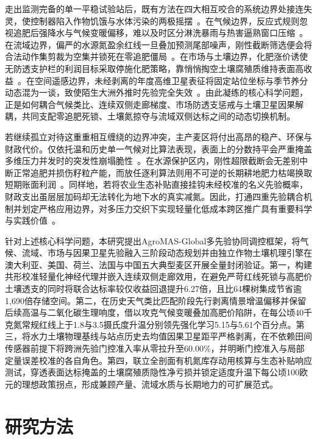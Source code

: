 \documentclass[11pt,a4paper]{article}
\begin{document}
走出监测完备的单一平稳试验站后，既有方法在四大相互咬合的系统边界处接连失灵，使控制器陷入作物饥饿与水体污染的两极摇摆~\citep{baja2025}。在气候边界，反应式规则忽视追肥后强降水与气候变暖偏移，难以及时区分淋洗暴雨与热害逼熟窗口压缩~\citep{asseng2015}。在流域边界，偏严的水源氮盈余红线一旦叠加预测尾部噪声，刚性截断筛选便会将合法动作集剪裁为空集并锁死在零追肥僵局~\citep{eu1991,klages2020}。在市场与土壤边界，化肥涨价诱使无防透支护栏的利润目标采取停施化肥策略，靠悄悄掏空土壤腐殖质维持表面高收益~\citep{eschmann2021,tan2005}。在空间遥感边界，未经剥离的年度高维卫星表征将固定站位坐标与季节养分动态混为一谈，致使陌生大洲外推时先验完全失效~\citep{gaso2023,roberts2017}。由此凝练的核心科学问题，正是如何耦合气候类比、连续双侧走廊梯度、市场防透支惩戒与土壤卫星因果解耦，共同支配零追肥死锁、土壤氮掠夺与流域双侧达标之间的动态切换机制。

若继续孤立对待这重重相互缠绕的边界冲突，主产麦区将付出高昂的稳产、环保与财政代价。仅依托温和历史单一气候对比算法表现，表面上的分数持平会严重掩盖多维压力并发时的突发性崩塌脆性~\citep{baja2025}。在水源保护区内，刚性超限截断会无差别中断正常追肥并损伤籽粒产能，而放任逐利算法则用不可逆的长期耕地肥力枯竭换取短期账面利润~\citep{zhou2016,booth2023}。同样地，若将农业生态补贴直接挂钩未经校准的名义先验概率，财政支出虽层层加码却无法转化为地下水的真实减氮。因此，打通四重先验耦合机制并划定严格应用边界，对多压力交织下实现轻量化低成本跨区推广具有重要科学与实践价值~\citep{goldenits2024}。

针对上述核心科学问题，本研究提出AgroMAS-Global多先验协同调控框架，将气候、流域、市场与因果卫星先验融入三阶段动态规划并由独立作物土壤机理引擎在澳大利亚、美国、荷兰、法国与中国五大典型麦区开展全量封闭验证。第一，构建共形校准轻量化神经代理并嵌入连续双侧走廊效用，在避免严苛红线死锁与高肥价土壤透支的同时将联合达标率较仅收益回退提升6.27倍，且比64棵树集成节省逾1,690倍存储空间。第二，在历史天气类比匹配阶段先行剥离情景增温偏移并保留后续高温与二氧化碳生理响度，借以攻克气候变暖叠加高肥价陷阱，在每公顷40千克氮常规红线上于1.8与3.5摄氏度升温分别领先强化学习5.15与5.61个百分点。第三，将水力土壤物理基线与站点历史去均值因果卫星距平严格剥离，在不依赖田间传感器前提下将跨洲先验门控准入率从零拉升至60.00\%，并明晰门控准入与局部定量误差校准的各自角色。第四，联立全剖面有机氮库存动用核算与生态补贴响应测试，穿透表面达标掩盖的土壤腐殖质隐性净亏损并锁定适度升温下每公顷100欧元的理想政策拐点，形成兼顾产量、流域水质与长期地力的可扩展范式。

\FloatBarrier

\section{研究方法}
\end{document}
